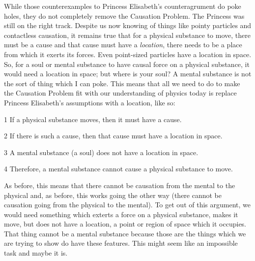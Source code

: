 While those counterexamples to Princess Elisabeth's counteragrument do poke holes, they do not completely remove the Causation Problem. The Princess was still on the right track. Despite us now knowing of things like pointy particles and contactless causation, it remains true that for a physical substance to move, there must be a cause and that cause must have a \emph{location}, there needs to be a place from which it exerts its forces. Even point-sized particles have a location in space. So, for a soul or mental substance to have causal force on a physical substance, it would need a location in space; but where is your soul? A mental substance is not the sort of thing which I can poke. This means that all we need to do to make the Causation Problem fit with our understanding of physics today is replace Princess Elisabeth's assumptions with a location, like so:

\begin{earg}
     \item[1 ]  If a physical substance moves, then it must have a cause.
     \item[2 ] If there is such a cause, then that cause must have a location in space.
     \item[3 ] A mental substance (a soul) does not have a location in space.
     \item[4 ] Therefore, a mental substance cannot cause a physical substance to move.
\end{earg}

As before, this means that there cannot be causation from the mental to the physical and, as before, this works going the other way (there cannot be causation going from the physical to the mental). To get out of this argument, we would need something which exterts a force on a physical substance, makes it move, but does not have a location, a point or region of space which it occupies. That thing cannot be a mental substance because those are the things which we are trying to show do have these features. This might seem like an impossible task and maybe it is. 

